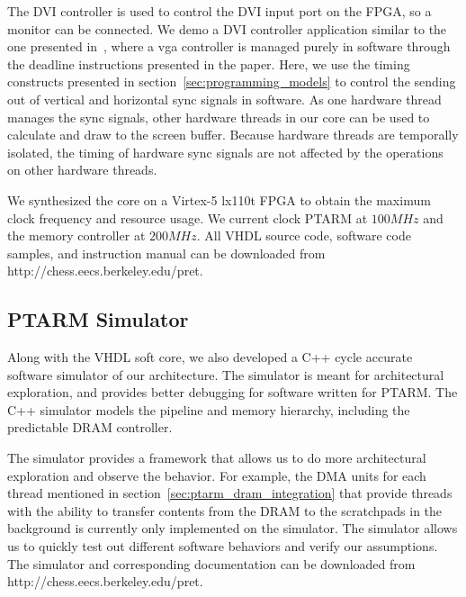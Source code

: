 The DVI controller is used to control the DVI input port on the FPGA, so a monitor can be connected.
We demo a DVI controller application similar to the one presented in~\cite{ip2006processor}, where a vga controller is managed purely in software through the deadline instructions presented in the paper.
Here, we use the timing constructs presented in section~\ref{sec:programming_models} to control the sending out of vertical and horizontal sync signals in software.
As one hardware thread manages the sync signals, other hardware threads in our core can be used to calculate and draw to the screen buffer.  
Because hardware threads are temporally isolated, the timing of hardware sync signals are not affected by the operations on other hardware threads.  

We synthesized the core on a Virtex-5 lx110t FPGA to obtain the maximum clock frequency and resource usage. 
We current clock PTARM at $100MHz$ and the memory controller at $200MHz$. 
All VHDL source code, software code samples, and instruction manual can be downloaded from http://chess.eecs.berkeley.edu/pret.   

\subsection{PTARM Simulator}
\label{sec:ptarm_sim}
Along with the VHDL soft core, we also developed a C++ cycle accurate software simulator of our architecture.
The simulator is meant for architectural exploration, and provides better debugging for software written for PTARM.  
The C++ simulator models the pipeline and memory hierarchy, including the predictable DRAM controller.  

The simulator provides a framework that allows us to do more architectural exploration and observe the behavior.
For example, the DMA units for each thread mentioned in section~\ref{sec:ptarm_dram_integration} that 
provide threads with the ability to transfer contents from the DRAM to the scratchpads in the background is currently only implemented on the simulator. 
The simulator allows us to quickly test out different software behaviors and verify our assumptions. 
The simulator and corresponding documentation can be downloaded from http://chess.eecs.berkeley.edu/pret. 


